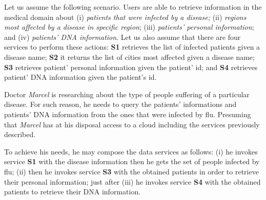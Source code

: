 %

Let us assume the following scenario. Users are able to retrieve information  in
the medical domain about (i) \textit{patients that were infected by a disease;}
(ii) \textit{regions most affected by a disease in specific region}; (iii)
\textit{patients' personal information}; and (iv) \textit{patients' DNA
information}.
Let us also assume that there are four services to perform these actions:
\textbf{S1} retrieves the list of infected patients given a disease name; 
\textbf{S2} it returns the list of cities most affected given a disease name; 
\textbf{S3} retrieves patient' personal information given the patient' id; and 
\textbf{S4} retrieves patient' DNA information given the patient's id.


Doctor \textit{Marcel} is researching about the type of people suffering of a
particular disease. For such reason, he needs to query the patients'
informations and patients' DNA information from the ones that were infected by
flu. Presuming that \textit{Marcel} has at his disposal access to a cloud
including the services previously described. 

To achieve his needs, he may
compose the data services as follows:
(i) he invokes service \textbf{S1} with the disease information then he gets the set of people infected by flu; 
(ii) then he invokes service \textbf{S3} with the obtained patients in order to retrieve their personal information; 
just after (iii) he invokes service \textbf{S4} with the obtained patients to
retrieve their DNA information.


